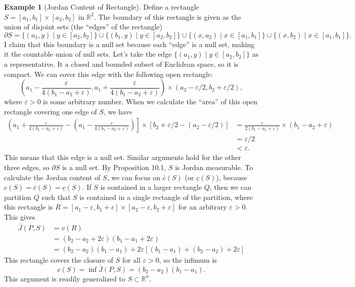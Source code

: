 \documentclass{article}
\newcommand{\R}{\mathbb{R}}
\theoremstyle{definition}
\newtheorem{example}{Example}[section]
\begin{document}
\begin{example}[Jordan Content of Rectangle]
	Define a rectangle $S = [a_1,b_1]\times [a_2,b_2]$ in $\R^2$. The boundary of this rectangle is given as the union of disjoint sets (the ``edges'' of the rectangle) $$ \partial S = \{(a_1, y)\mid y \in [a_2,b_2] \} \cup  \{(b_1, y)\mid y \in [a_2,b_2] \} \cup  \{(x, a_2)\mid x \in [a_1,b_1] \} \cup  \{(x, b_2)\mid x \in [a_1,b_1] \}.$$ I claim that this boundary is a null set because each ``edge'' is a null set, making it the countable union of null sets. Let's take the edge $ \{(a_1, y)\mid y \in [a_2,b_2] \}$ as a representative. It a closed and bounded subset of Euclidean space, so it is compact. We can cover this edge with the following open rectangle: 
	$$ \left(a_1 - \frac{\varepsilon}{4(b_1-a_2+\varepsilon)}, a_1 + \frac{\varepsilon}{4(b_1-a_2+\varepsilon)}\right)\times \left(a_2 - \varepsilon/2, b_2 + \varepsilon/2\right),$$ where $\varepsilon > 0$ is some arbitrary number. When we calculate the ``area'' of this open rectangle covering one edge of $S$, we have 
	\begin{align*}
		\left(a_1 + \frac{\varepsilon}{4(b_1-a_2+\varepsilon)} - \left(a_1 - \frac{\varepsilon}{4(b_1-a_2+\varepsilon)}\right)\right]\times [b_2 + \varepsilon/2 - (a_2 - \varepsilon/2)] & =  \frac{\varepsilon}{2(b_1-a_2+\varepsilon)} \times (b_1-a_2+\varepsilon)\\
		& = \varepsilon/2 \\
		& < \varepsilon.
	\end{align*}
This means that this edge is a null set. Similar arguments hold for the other three edges, so $\partial S$ is a null set. By Proposition 10.1, $S$ is Jordan measurable. To calculate the Jordan content of $S$, we can focus on $\bar c(S)$ (or $\underline c(S)$), because $c(S) = \bar c(S) = \underline c(S)$. If $S$ is contained in a larger rectangle $Q$, then we can partition $Q$ such that $S$ is contained in a single rectangle of the partition, where this rectangle is $R = [a_1 - \varepsilon, b_1 + \varepsilon]\times [a_2 - \varepsilon, b_2 + \varepsilon]$ for an arbitrary $\varepsilon > 0$. This gives 
\begin{align*}
	\bar J(P,S) & = v(R) \\
						& = (b_2 - a_2 + 2\varepsilon) (b_1 - a_1 + 2\varepsilon)\\
						& = (b_2 - a_2)(b_1-a_1) + 2\varepsilon[(b_1-a_1) + (b_2 - a_2) + 2\varepsilon]
\end{align*}
This rectangle covers the closure of $S$ for all $\varepsilon > 0$, so the infimum is 
$$ c(S) = \inf 	\bar J(P,S) = (b_2 - a_2)(b_1-a_1).$$ This argument is readily generalized to $S \subset \R^n$.  
\end{example}
\end{document}
